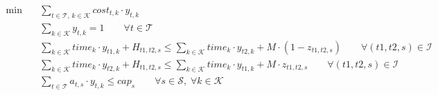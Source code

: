\begin{align}
  \min\quad & \sum_{t \in \mathcal{T},\, k \in \mathcal{K}} \mathit{cost}_{t,k} \cdot y_{t,k} \tag{total\_cost} \\
  & \sum_{k \in \mathcal{K}} y_{t,k} = 1 \qquad \forall t \in \mathcal{T} \tag{assign} \\
  & \sum_{k \in \mathcal{K}} \mathit{time}_{k} \cdot y_{t1,k}
      + \mathit{H}_{t1,t2,s}
      \le \sum_{k \in \mathcal{K}} \mathit{time}_{k} \cdot y_{t2,k}
      + \mathit{M} \cdot (1 - z_{t1,t2,s})
      \qquad \forall (t1,t2,s) \in \mathcal{I} \tag{headway1} \\
  & \sum_{k \in \mathcal{K}} \mathit{time}_{k} \cdot y_{t2,k}
      + \mathit{H}_{t1,t2,s}
      \le \sum_{k \in \mathcal{K}} \mathit{time}_{k} \cdot y_{t1,k}
      + \mathit{M} \cdot z_{t1,t2,s}
      \qquad \forall (t1,t2,s) \in \mathcal{I} \tag{headway2} \\
  & \sum_{t \in \mathcal{T}} a_{t,s} \cdot y_{t,k} \le \mathit{cap}_{s}
      \qquad \forall s \in \mathcal{S},\; \forall k \in \mathcal{K} \tag{capacity}
\end{align}